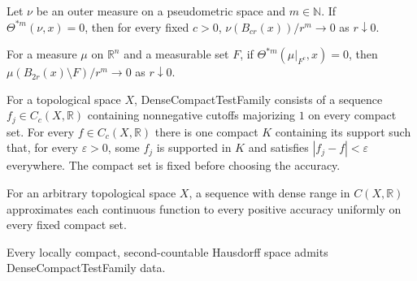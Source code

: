 \begin{lemma}
\label{lem:vanishing-density-scaled-balls}

Let $\nu$ be an outer measure on a pseudometric space and $m\in\mathbb N$. If $\Theta^{*m}(\nu,x)=0$, then for every fixed $c>0$, $\nu(B_{cr}(x))/r^m\to0$ as $r\downarrow0$.
\end{lemma}

\begin{lemma}
\label{lem:vanishing-density-negligible-deletion}

For a measure $\mu$ on $\mathbb R^n$ and a measurable set $F$, if $\Theta^{*m}(\mu|_{F^c},x)=0$, then $\mu(B_{2r}(x)\setminus F)/r^m\to0$ as $r\downarrow0$.
\end{lemma}

\begin{definition}
\label{def:dense-compact-tests}

For a topological space $X$, DenseCompactTestFamily consists of a sequence $f_j\in C_c(X,\mathbb R)$ containing nonnegative cutoffs majorizing $1$ on every compact set. For every $f\in C_c(X,\mathbb R)$ there is one compact $K$ containing its support such that, for every $\varepsilon>0$, some $f_j$ is supported in $K$ and satisfies $|f_j-f|<\varepsilon$ everywhere. The compact set is fixed before choosing the accuracy.
\end{definition}

\begin{lemma}
\label{lem:dense-continuous-approximation}

For an arbitrary topological space $X$, a sequence with dense range in $C(X,\mathbb R)$ approximates each continuous function to every positive accuracy uniformly on every fixed compact set.
\end{lemma}

\begin{lemma}
\label{lem:dense-compact-tests-exist}

Every locally compact, second-countable Hausdorff space admits DenseCompactTestFamily data.
\end{lemma}

